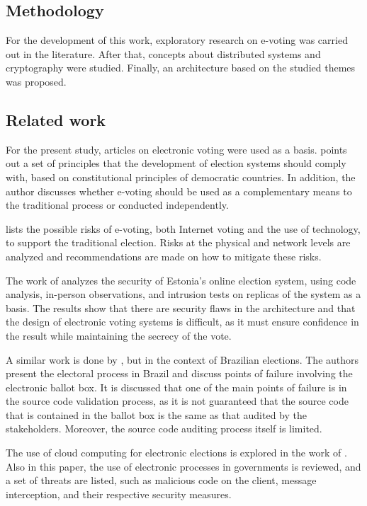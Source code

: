 \documentclass[english]{textolivre}
\begin{document}
\subsection{Methodology \label{sec-methodology}}

For the development of this work, exploratory research on e-voting was carried out in the literature. After that, concepts about distributed systems and cryptography were studied. Finally, an architecture based on the studied themes was proposed.

\subsection{Related work \label{sec-related}}

For the present study, articles on electronic voting were used as a basis. \textcite{Gritzalis} points out a set of principles that the development of election systems should comply with, based on constitutional principles of democratic countries. In addition, the author discusses whether e-voting should be used as a complementary means to the traditional process or conducted independently.

\textcite{lauer2004risk} lists the possible risks of e-voting, both Internet voting and the use of technology, to support the traditional election. Risks at the physical and network levels are analyzed and recommendations are made on how to mitigate these risks.

The work of \textcite{estonia} analyzes the security of Estonia's online election system, using code analysis, in-person observations, and intrusion tests on replicas of the system as a basis. The results show that there are security flaws in the architecture and that the design of electronic voting systems is difficult, as it must ensure confidence in the result while
maintaining the secrecy of the vote.

A similar work is done by \textcite{aranha}, but in the context of Brazilian elections. The authors present the electoral process in Brazil and discuss points of failure involving the electronic ballot box. It is discussed that one of the main points of failure is in the source code validation process, as it is not guaranteed that the source code that is contained in the ballot box is the same as that audited by the stakeholders. Moreover, the source code auditing process itself is limited.

The use of cloud computing for electronic elections is explored in the work of \textcite{Lekkas}. Also in this paper, the use of electronic processes in governments is reviewed, and a set of threats are listed, such as malicious code on the client, message interception, and
their respective security measures.
\end{document}
